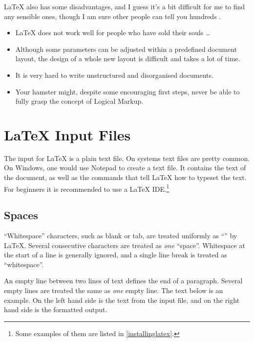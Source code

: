 \medskip

\noindent\LaTeX{} also has some disadvantages, and I guess it's a bit
difficult for me to find any sensible ones, though I am sure other people
can tell you hundreds \smiley.

\begin{itemize}
  \item \LaTeX{} does not work well for people who have sold their
        souls \ldots
  \item Although some parameters can be adjusted within a predefined
        document layout, the design of a whole new layout is difficult and
        takes a lot of time.
  \item It is very hard to write unstructured and disorganised documents.
  \item Your hamster might, despite some encouraging first steps, never be
        able to fully grasp the concept of Logical Markup.
\end{itemize}

\section{\LaTeX{} Input Files}

The input for \LaTeX{} is a plain text file. On \Unix{} systems text files are
pretty common. On Windows, one would use Notepad to create a text file. It
contains the text of the document, as well as the commands that tell \LaTeX{}
how to typeset the text. For beginners it is recommended to use a \LaTeX{}
IDE.\footnote{Some examples of them are listed in
  \autoref{installinglatex}.}

\subsection{Spaces}\label{sec:spaces}

\enquote{Whitespace} characters, such as blank or tab, are treated uniformly as
\enquote{} by \LaTeX{}. Several consecutive 
characters are treated as \emph{one} \enquote{space}. Whitespace at the start
of a line is generally ignored, and a single line break is treated as
\enquote{whitespace}.

An empty line between two lines of text defines the end of a paragraph. Several
empty lines are treated the same as \emph{one} empty line. The text below is an
example. On the left hand side is the text from the input file, and on the
right hand side is the formatted output.

